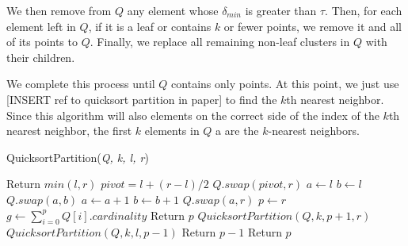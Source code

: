 We then remove from $Q$ any element whose $\delta_{min}$ is greater than $\tau$. Then, for each element left 
in $Q$, if it is a leaf or contains $k$ or fewer points, we remove it and all of its points to $Q$. Finally, we
replace all remaining non-leaf clusters in $Q$ with their children. 

We complete this process until $Q$ contains only points. At this point, we 
just use [INSERT ref to quicksort partition in paper] to find the $k$th 
nearest neighbor. Since this algorithm will also elements on the correct side of 
the index of the $k$th nearest neighbor, the first $k$ elements in $Q$ a are the $k$-nearest neighbors.


\begin{algorithm} %
    \caption{QuicksortPartition(\emph{Q, k, l, r})} %
    \label{alg:quicksort-partition} %
    \begin{algorithmic}[5] %
            \STATE Return $min(l, r)$
        \ELSE 
            \STATE $pivot = l + (r - l) / 2$
            \STATE $Q.swap(pivot, r)$
            \STATE $a \leftarrow l$
            \STATE $b \leftarrow l$
                    \STATE $Q.swap(a, b)$
                    \STATE $a \leftarrow a + 1$
                \ENDIF
                \STATE $b \leftarrow b + 1$
            \ENDWHILE
            \STATE $Q.swap(a, r)$
            \STATE $p \leftarrow r$
            \STATE $g \leftarrow \sum_{i=0}^{p} Q[i].cardinality$
                \STATE Return $p$
                \STATE $QuicksortPartition(Q, k, p + 1, r)$
            \ELSE 
                    \STATE $QuicksortPartition(Q, k, l, p - 1)$
                    \STATE Return $p - 1$
                \ELSE
                    \STATE Return $p$
                \ENDIF
            \ENDIF
        \ENDIF
    \end{algorithmic}
    \end{algorithm}

